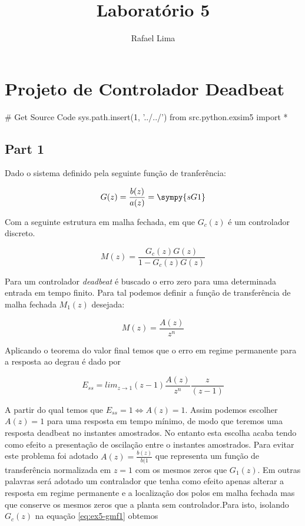 \documentclass[a4paper,11pt]{article}
\title{Laboratório 5} %
\author{Rafael Lima}
\begin{document}

\section{Projeto de Controlador Deadbeat}

\begin{sympycode}
# Get Source Code
sys.path.insert(1, '../../')
from src.python.exsim5 import *
\end{sympycode}


\subsection{Part 1}

Dado o sistema definido pela seguinte função de tranferência:

\begin{equation}\label{eq:ex5-g1}
    G(z) = \frac{b(z)}{a(z)} = \sympy{sG1}
\end{equation}

Com a seguinte estrutura em malha fechada, em que $G_c(z)$ é um controlador discreto.

\begin{equation}
    M(z) = \frac{G_c(z)G(z)}{1 - G_c(z)G(z)}
\end{equation}

Para um controlador \textit{deadbeat} é buscado o erro zero para uma determinada entrada em tempo finito. Para tal podemos definir a função de transferência de malha fechada $M_1(z)$ desejada:

\begin{equation}\label{eq:ex5-gmf1}
    M(z) = \frac{A(z)}{z^n}
\end{equation}

Aplicando o teorema do valor final temos que o erro em regime permanente para a resposta ao degrau é dado por

$$E_{ss} = lim_{z \rightarrow 1}(z - 1)\frac{A(z)}{z^n}\frac{z}{(z-1)}$$

A partir do qual temos que $E_{ss} = 1 \Leftrightarrow A(z) = 1$. Assim podemos escolher $A(z) = 1$ para uma resposta em tempo mínimo, de modo que teremos uma resposta deadbeat no instantes amostrados. No entanto esta escolha acaba tendo como efeito a presentação de oscilação entre o instantes amostrados. Para evitar este problema foi adotado $A(z) = \frac{b(z)}{b(1}$ que representa um função de transferência normalizada em $z=1$ com os mesmos zeros que $G_1(z)$. Em outras palavras será adotado um contralador que tenha como efeito apenas alterar a resposta em regime permanente e a localização dos polos em malha fechada mas que conserve os mesmos zeros que a planta sem controlador.Para isto, isolando $G_c(z)$ na equação \ref{eq:ex5-gmf1} obtemos
\end{document}
